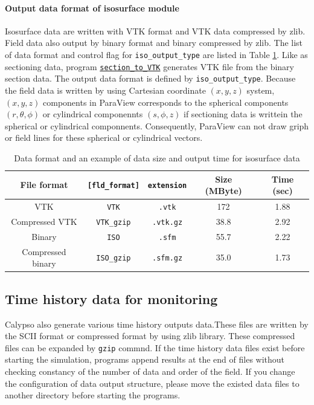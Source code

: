 \paragraph{Output data format of isosurface module}
\label{sec:PSF_data}
Isosurface data are written with VTK format and VTK data compressed by zlib. Field data also output by binary format and binary compressed by zlib. The list of data format and control flag for \verb|iso_output_type| are listed in Table \ref{table:ISO_data}. Like as sectioning data, program \hyperref[section:section_to_VTK]{\tt section\_to\_VTK} generates VTK file from the binary section data. The output data format is defined by \verb|iso_output_type|. Because the field data is written by using Cartesian coordinate $(x,y,z)$ system, $(x,y,z)$ components in ParaView corresponds to the spherical components $(r, \theta, \phi)$ or cylindrical componennts $(s,\phi, z)$ if sectioning data is writtein the spherical or cylindrical componnents. Consequently, ParaView can not draw griph or field lines for these spherical or cylindrical vectors.
%
\begin{table}[htp]
\caption{Data format and an example of data size and output time for isosurface data}
\label{table:ISO_data}
\begin{center} 
\begin{tabular}{|c|c|c|c|c|}
\hline
File format & \verb|[fld_format]| & \verb|extension| &  Size  (MByte) & Time (sec)   \\ \hline \hline
VTK &\verb|VTK| &  \verb|.vtk| & 172 & 1.88 \\ \hline
Compressed VTK &\verb|VTK_gzip| &  \verb|.vtk.gz| & 38.8 & 2.92  \\ \hline
Binary &\verb|ISO| &  \verb|.sfm| & 55.7 & 2.22 \\ \hline
Compressed binary & \verb|ISO_gzip| & \verb|.sfm.gz| & 35.0 &  1.73  \\ \hline
\end{tabular}
\end{center} 
\end{table} 
%

\subsection{Time history data for monitoring}
Calypso also generate various time history outputs data.These files are written by the SCII format or compressed format by using zlib library. These compressed files can be expanded by {\tt gzip} commnd. 
If the time history data files exist before starting the simulation, programs append results at the end of files without checking constancy of the number of data and order of the field. If you change the configuration of data output structure, please move the existed data files to another directory before starting the programs.

